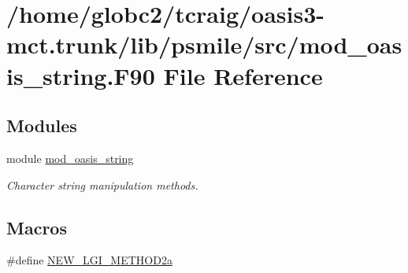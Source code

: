 \hypertarget{mod__oasis__string_8_f90}{}\section{/home/globc2/tcraig/oasis3-\/mct.trunk/lib/psmile/src/mod\+\_\+oasis\+\_\+string.F90 File Reference}
\label{mod__oasis__string_8_f90}
\subsection*{Modules}
\begin{DoxyCompactItemize}
\item 
module \hyperlink{namespacemod__oasis__string}{mod\+\_\+oasis\+\_\+string}
\begin{DoxyCompactList}\small\item\em Character string manipulation methods. \end{DoxyCompactList}\end{DoxyCompactItemize}
\subsection*{Macros}
\begin{DoxyCompactItemize}
\item 
\#define \hyperlink{mod__oasis__string_8_f90_a732dc6b61280242f5cf9c6b817dfd452}{N\+E\+W\+\_\+\+L\+G\+I\+\_\+\+M\+E\+T\+H\+O\+D2a}
\end{DoxyCompactItemize}
